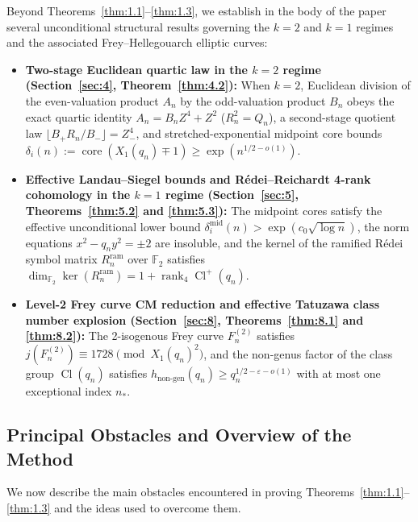 \documentclass[11pt,reqno]{amsart}
\theoremstyle{remark}
\numberwithin{equation}{section}
\newcommand{\F}{\mathbb{F}}
\DeclareMathOperator{\core}{core}
\DeclareMathOperator{\Cl}{Cl}
\DeclareMathOperator{\rank}{rank}
\begin{document}
Beyond Theorems~\ref{thm:1.1}--\ref{thm:1.3}, we establish in the body of the paper several unconditional structural results governing the $k = 2$ and $k = 1$ regimes and the associated Frey--Hellegouarch elliptic curves:
\begin{itemize}
\item \textbf{Two-stage Euclidean quartic law in the $k = 2$ regime (Section~\ref{sec:4}, Theorem~\ref{thm:4.2}):} When $k = 2$, Euclidean division of the even-valuation product $A_n$ by the odd-valuation product $B_n$ obeys the exact quartic identity $A_n = B_n Z^4 + Z^2$ ($R_n^2 = Q_n$), a second-stage quotient law $\lfloor B_+ R_n / B_- \rfloor = Z_-^4$, and stretched-exponential midpoint core bounds $\delta_i(n) := \core(X_1(q_n) \mp 1) \ge \exp(n^{1/2-o(1)})$.
\item \textbf{Effective Landau--Siegel bounds and R\'edei--Reichardt 4-rank cohomology in the $k = 1$ regime (Section~\ref{sec:5}, Theorems~\ref{thm:5.2} and \ref{thm:5.3}):} The midpoint cores satisfy the effective unconditional lower bound $\delta_i^{\mathrm{mid}}(n) > \exp(c_0\sqrt{\log n})$, the norm equations $x^2 - q_n y^2 = \pm 2$ are insoluble, and the kernel of the ramified R\'edei symbol matrix $R_n^{\mathrm{ram}}$ over $\F_2$ satisfies $\dim_{\F_2} \ker(R_n^{\mathrm{ram}}) = 1 + \rank_4 \Cl^+(q_n)$.
\item \textbf{Level-2 Frey curve CM reduction and effective Tatuzawa class number explosion (Section~\ref{sec:8}, Theorems~\ref{thm:8.1} and \ref{thm:8.2}):} The 2-isogenous Frey curve $F_n^{(2)}$ satisfies $j(F_n^{(2)}) \equiv 1728 \pmod{X_1(q_n)^2}$, and the non-genus factor of the class group $\Cl(q_n)$ satisfies $h_{\mathrm{non\text{-}gen}}(q_n) \ge q_n^{1/2-\varepsilon-o(1)}$ with at most one exceptional index $n_*$.
\end{itemize}

\subsection{Principal Obstacles and Overview of the Method}
We now describe the main obstacles encountered in proving Theorems~\ref{thm:1.1}--\ref{thm:1.3} and the ideas used to overcome them.
\end{document}
